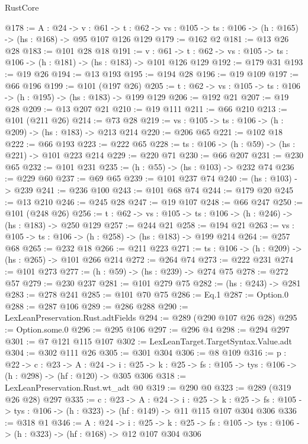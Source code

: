 \begin{lexlean}{RustCore}
\begin{coremodule}
@178 := {A : @24} ->
  {v : @61} ->
  {t : @62} -> {vs : @105} -> {ts : @106} -> (h : @165) -> (hs : @168) -> @95 @107 @126 @129
@179 := @162 @2
@181 := @13 @26 @28
@183 := @101 @28 @18
@191 := {v : @61} ->
  {t : @62} -> {vs : @105} -> {ts : @106} -> (h : @181) -> (hs : @183) -> @101 @126 @129
@192 := @179 @31
@193 := @19 @26
@194 := @13 @193
@195 := @194 @28
@196 := @19 @109
@197 := @66 @196
@199 := @101 (@197 @26)
@205 := {t : @62} -> {vs : @105} -> {ts : @106} -> (h : @195) -> (hs : @183) -> @199 @129
@206 := @192 @21
@207 := @19 @28
@209 := @13 @207 @21
@210 := @19 @111
@211 := @66 @210
@213 := @101 (@211 @26)
@214 := @73 @28
@219 := {vs : @105} -> {ts : @106} -> (h : @209) -> (hs : @183) -> @213 @214
@220 := @206 @65
@221 := @102 @18
@222 := @66 @193
@223 := @222 @65
@228 := {ts : @106} -> (h : @59) -> (hs : @221) -> @101 @223 @214
@229 := @220 @71
@230 := @66 @207
@231 := @230 @65
@232 := @101 @231
@235 := (h : @55) -> (hs : @103) -> @232 @74
@236 := @229 @60
@237 := @69 @65
@239 := @101 @237 @74
@240 := (hs : @103) -> @239
@241 := @236 @100
@243 := @101 @68 @74
@244 := @179 @20
@245 := @13 @210
@246 := @245 @28
@247 := @19 @107
@248 := @66 @247
@250 := @101 (@248 @26)
@256 := {t : @62} -> {vs : @105} -> {ts : @106} -> (h : @246) -> (hs : @183) -> @250 @129
@257 := @244 @21
@258 := @194 @21
@263 := {vs : @105} -> {ts : @106} -> (h : @258) -> (hs : @183) -> @199 @214
@264 := @257 @68
@265 := @232 @18
@266 := @211 @223
@271 := {ts : @106} -> (h : @209) -> (hs : @265) -> @101 @266 @214
@272 := @264 @74
@273 := @222 @231
@274 := @101 @273
@277 := (h : @59) -> (hs : @239) -> @274 @75
@278 := @272 @57
@279 := @230 @237
@281 := @101 @279 @75
@282 := (hs : @243) -> @281
@283 := @278 @241
@285 := @101 @70 @75
@286 := Eq.{1}
@287 := Option.{0}
@288 := @287 @106
@289 := @286 @288
@290 := LexLeanPreservation.Rust.adtFields
@294 := @289 (@290 @107 @26 @28)
@295 := Option.some.{0}
@296 := @295 @106
@297 := @296 @4
@298 := @294 @297
@301 := @7 @121 @115 @107
@302 := LexLeanTarget.TargetSyntax.Value.adt
@304 := @302 @111 @26
@305 := @301 @304
@306 := @8 @109
@316 := {p : @22} ->
  {c : @23} ->
  {A : @24} ->
  {i : @25} -> {k : @25} -> {fs : @105} -> {tys : @106} -> (h : @298) -> (hf : @120) -> @305 @306
@318 := LexLeanPreservation.Rust.wt_adt @0
@319 := @290 @0
@323 := @289 (@319 @26 @28) @297
@335 := {c : @23} ->
  {A : @24} ->
  {i : @25} ->
  {k : @25} -> {fs : @105} -> {tys : @106} -> (h : @323) -> (hf : @149) -> @11 @115 @107 @304 @306
@336 := @318 @1
@346 := {A : @24} ->
  {i : @25} ->
  {k : @25} -> {fs : @105} -> {tys : @106} -> (h : @323) -> (hf : @168) -> @12 @107 @304 @306

\end{coremodule}
\end{lexlean}
